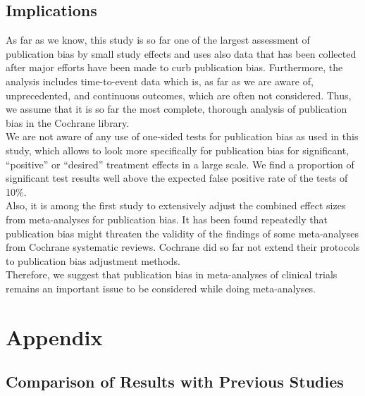 \documentclass[11pt,a4paper,twoside]{book}\usepackage[]{graphicx}\usepackage[]{color}
\begin{document}
\section{Implications}
As far as we know, this study is so far one of the largest assessment of publication bias by small study effects and uses also data that has been collected after major efforts have been made to curb publication bias. %
Furthermore, the analysis includes time-to-event data which is, as far as we are aware of, unprecedented, and continuous outcomes, which are often not considered. Thus, we assume that it is so far the most complete, thorough analysis of publication bias in the Cochrane library. \\
We are not aware of any use of one-sided tests for publication bias as used in this study, which allows to look more specifically for publication bias for significant, ``positive'' or ``desired'' treatment effects in a large scale. We find a proportion of significant test results well above the expected false positive rate of the tests of 10\%.\\
Also, it is among the first study to extensively adjust the combined effect sizes from meta-analyses for publication bias. It has been found repeatedly that publication bias might threaten the validity of the findings of some meta-analyses from Cochrane systematic reviews. Cochrane did so far not extend their protocols to publication bias adjustment methods.\\
Therefore, we suggest that publication bias in meta-analyses of clinical trials remains an important issue to be considered while doing meta-analyses. 


\appendix




\chapter{Appendix}\label{ch:Appendix}

\section{Comparison of Results with Previous Studies}
\end{document}
